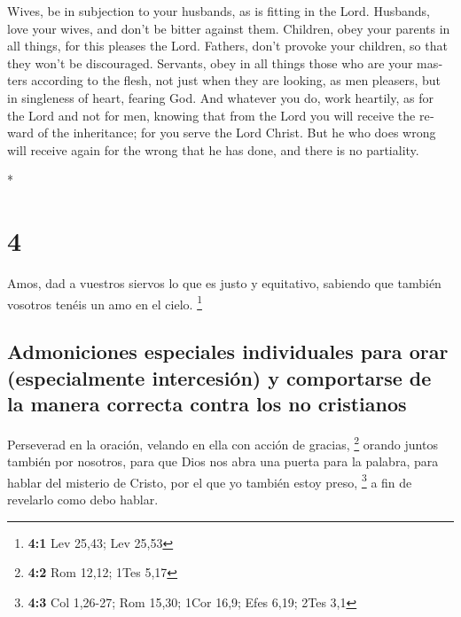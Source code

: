 \begin{paracol}{2}
\begin{otherlanguage}{english}
 Wives, be in subjection to your husbands, as is fitting
in the Lord.  Husbands, love your wives, and don't be
bitter against them.  Children, obey your parents in all
things, for this pleases the Lord.  Fathers, don't
provoke your children, so that they won't be discouraged.
 Servants, obey in all things those who are your masters
according to the flesh, not just when they are looking, as men pleasers,
but in singleness of heart, fearing God.  And whatever
you do, work heartily, as for the Lord and not for men, 
knowing that from the Lord you will receive the reward of the
inheritance; for you serve the Lord Christ.  But he who
does wrong will receive again for the wrong that he has done, and there
is no partiality.

\end{otherlanguage}

\switchcolumn[0]*

\hypertarget{section-6}{%
\section{4}\label{section-6}}

 Amos, dad a vuestros siervos lo que es justo y
equitativo, sabiendo que también vosotros tenéis un amo en el cielo.
\footnote{\textbf{4:1} Lev 25,43; Lev 25,53}

\hypertarget{admoniciones-especiales-individuales-para-orar-especialmente-intercesiuxf3n-y-comportarse-de-la-manera-correcta-contra-los-no-cristianos}{%
\subsection{Admoniciones especiales individuales para orar
(especialmente intercesión) y comportarse de la manera correcta contra
los no
cristianos}\label{admoniciones-especiales-individuales-para-orar-especialmente-intercesiuxf3n-y-comportarse-de-la-manera-correcta-contra-los-no-cristianos}}

 Perseverad en la oración, velando en ella con acción de
gracias, \footnote{\textbf{4:2} Rom 12,12; 1Tes 5,17} 
orando juntos también por nosotros, para que Dios nos abra una puerta
para la palabra, para hablar del misterio de Cristo, por el que yo
también estoy preso, \footnote{\textbf{4:3} Col 1,26-27; Rom 15,30; 1Cor
  16,9; Efes 6,19; 2Tes 3,1}  a fin de revelarlo como debo
hablar.


\end{paracol}
